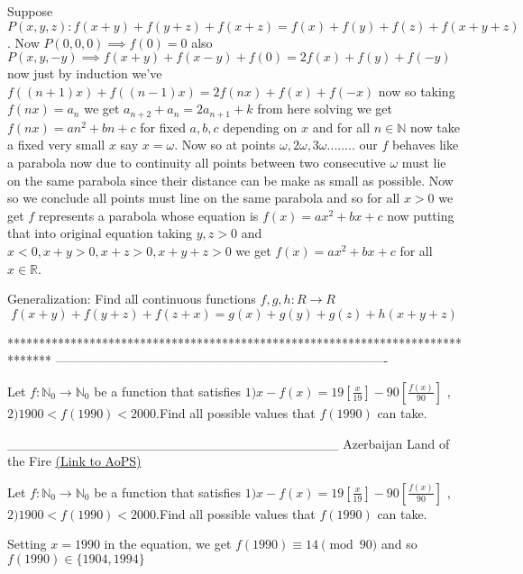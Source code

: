 \begin{solution}
	Suppose $P(x,y,z): f(x+y)+f(y+z)+f(x+z)=f(x)+f(y)+f(z)+f(x+y+z)$. 
Now $P(0,0,0)\implies f(0)=0$ also $P(x,y,-y)\implies f(x+y)+f(x-y)+f(0)=2f(x)+f(y)+f(-y)$ now just by induction we've $f((n+1)x)+f((n-1)x)=2f(nx)+f(x)+f(-x)$  now so taking $f(nx)=a_n$ we get $a_{n+2}+a_{n}=2a_{n+1}+k$ from here solving we get $f(nx)=an^2+bn+c$ for fixed $a,b,c$ depending on $x$ and for all $n\in\mathbb N$ now take a fixed very small $x$ say $x=\omega$. Now so at points $\omega,2\omega,3\omega........$ our $f$ behaves like a parabola now due to continuity all points between two consecutive $\omega$ must lie on the same parabola since their distance can be make as small as possible. Now so we conclude all points must line on the same parabola and so for all $x>0$ we get $f$ represents a parabola whose equation is $f(x)=ax^2+bx+c$ now putting that into original equation taking $y,z>0$ and $x<0,x+y>0,x+z>0,x+y+z>0$ we get $f(x)=ax^2+bx+c$ for all $x\in\mathbb R$.
\end{solution}



\begin{solution}
	Generalization:  
Find all continuous functions $f,g,h :R \rightarrow R $ \[ f(x+y)+f(y+z)+f(z+x)=g(x)+g(y)+g(z)+h(x+y+z) \]
\end{solution}
*******************************************************************************
-------------------------------------------------------------------------------

\begin{problem}
	Let ${{f: \mathbb{N}_{0}}\to\mathbb{N}_{0}}$ be a function that satisfies $1)x-f(x)=19[ \frac{x}{19}]-90[ \frac{f(x)}{90}]$ , $2)1900<f(1990)<2000$.Find all possible values that $f(1990)$ can take.


___________________________________
Azerbaijan Land of the Fire
	\flushright \href{https://artofproblemsolving.com/community/c6h532797}{(Link to AoPS)}
\end{problem}



\begin{solution}
	\begin{tcolorbox}Let ${{f: \mathbb{N}_{0}}\to\mathbb{N}_{0}}$ be a function that satisfies $1)x-f(x)=19[ \frac{x}{19}]-90[ \frac{f(x)}{90}]$ , $2)1900<f(1990)<2000$.Find all possible values that $f(1990)$ can take.\end{tcolorbox}
Setting $x=1990$ in the equation, we get $f(1990)\equiv 14\pmod{90}$ and so $\boxed{f(1990)\in\{1904,1994\}}$
\end{solution}



